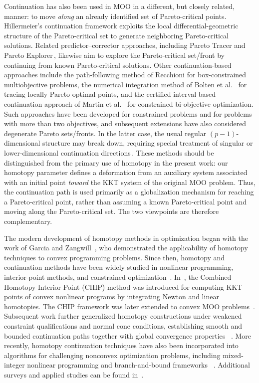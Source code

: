 \documentclass[11pt,pdflatex,sn-mathphys-ay]{sn-jnl}%
\theoremstyle{definition}
\theoremstyle{thmstyleone}%
\theoremstyle{thmstyletwo}%
\theoremstyle{thmstylethree}%
\newcommand{\add}[1]{\textcolor{revisionblue}{#1}}
\begin{document}
	\add{Continuation has also been used in MOO in a different, but closely
		related, manner: to move \emph{along} an already identified set of
		Pareto-critical points. Hillermeier's continuation framework exploits
		the local differential-geometric structure of the Pareto-critical set
		to generate neighboring Pareto-critical solutions. Related
		predictor--corrector approaches, including Pareto Tracer and Pareto
		Explorer\,\cite{martin2018pareto,schutze2020explorer}, likewise aim to explore the Pareto-critical set/front by
		continuing from known Pareto-critical solutions. 
		\add{Other continuation-based approaches include
			the path-following method of Recchioni
			\cite{recchioni2003path} for box-constrained
			multiobjective problems, the numerical integration
			method of Bolten et al.~\cite{bolten2021tracing}
			for tracing locally Pareto-optimal points, and
			the certified interval-based continuation approach
			of Martin et al.~\cite{martin2016continuation}
			for constrained bi-objective optimization.}
		Such approaches have
		been developed for constrained problems and for problems with more than
		two objectives, and subsequent extensions have also considered
		degenerate Pareto sets/fronts. In the latter case, the usual regular
		$(p-1)$-dimensional structure may break down, requiring special treatment
		of singular or lower-dimensional continuation directions\,\cite{schutze2025degenerate}.
		These methods should be distinguished from the primary use of homotopy
		in the present work: our homotopy parameter defines a deformation from
		an auxiliary system associated with an initial point \emph{toward} the
		KKT system of the original MOO problem. Thus, the continuation path is
		used primarily as a globalization mechanism for reaching a
		Pareto-critical point, rather than assuming a known Pareto-critical
		point and moving along the Pareto-critical set. The two viewpoints are
		therefore complementary.}
	
	The modern development of homotopy methods in optimization began with
	the work of Garcia and Zangwill~\cite{Garcia1981}, who demonstrated the
	applicability of homotopy techniques to convex programming problems.
	Since then, homotopy and continuation methods have been widely studied
	in nonlinear programming, interior-point methods, and constrained
	optimization~\cite{Megiddo1988,Kojima1988,dong2023spline,zhou2018global}.
	In~\cite{lin1997}, the Combined Homotopy Interior Point (CHIP) method was
	introduced for computing KKT points of convex nonlinear programs by
	integrating Newton and linear homotopies. The CHIP framework was later
	extended to convex MOO problems~\cite{Lin2003,Maeda2004}. Subsequent work
	further generalized homotopy constructions under weakened constraint
	qualifications and normal cone conditions, establishing smooth and
	bounded continuation paths together with global convergence properties
	~\cite{song2008,YaoSong2013_AM,Zhao2012_JAM}. More recently, homotopy
	continuation techniques have also been incorporated into algorithms for
	challenging nonconvex optimization problems, including mixed-integer
	nonlinear programming and branch-and-bound frameworks
	~\cite{MaLi2022_AICHE}. Additional surveys and applied studies can be
	found in~\cite{???????????????}.
	
\end{document}
